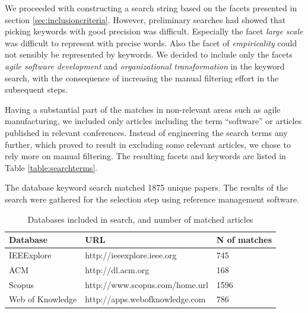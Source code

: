 We proceeded with constructing a search string based on the facets presented in
section \ref{sec:inclusioncriteria}. However, preliminary searches had showed
that picking keywords with good precision was difficult. Especially the facet
\emph{large scale} was difficult to represent with precise words. Also the facet
of \emph{empiricality} could not sensibly be represented by keywords. We decided
to include only the facets \emph{agile software development} and
\emph{organizational transformation} in the keyword search, with the consequence
of increasing the manual filtering effort in the subsequent steps.

Having a substantial part of the matches in non-relevant areas such as agile
manufacturing, we included only articles including the term ``software'' or
articles published in relevant conferences. Instead of engineering the search
terms any further, which proved to result in excluding some relevant articles,
we chose to rely more on manual filtering. The resulting facets and keywords are
listed in Table \ref{table:searchterms}.

The database keyword search matched 1875 unique papers. The results of the
search were gathered for the selection step using reference management software.

\begin{table}[h]
    \centering
    \begin{tabular}{ l l l }
        \toprule
        Database         & URL                         & N of matches   \\
        \midrule
        IEEExplore       & http://ieeexplore.ieee.org      & 745 \\ 
        ACM              & http://dl.acm.org               & 168 \\
        Scopus           & http://www.scopus.com/home.url  & 1596 \\
        Web of Knowledge & http://apps.webofknowledge.com  & 786 \\
        \bottomrule
    \end{tabular}
    \caption{Databases included in search, and number of matched articles}
    \label{table:databases}
\end{table}

